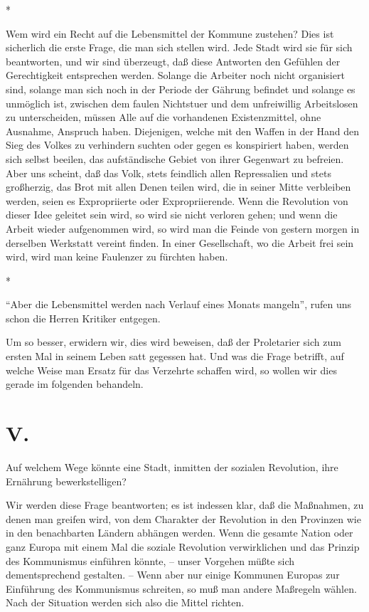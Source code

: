 \documentclass{scrbook}
\begin{document}
\begin{center}*\end{center}

Wem wird ein Recht auf die Lebensmittel der Kommune zustehen? Dies ist sicherlich die erste Frage, die man sich stellen wird. Jede Stadt wird sie für sich beantworten, und wir sind überzeugt, daß diese Antworten den Gefühlen der Gerechtigkeit entsprechen werden. Solange die Arbeiter noch nicht organisiert sind, solange man sich noch in der Periode der Gährung befindet und solange es unmöglich ist, zwischen dem faulen Nichtstuer und dem unfreiwillig Arbeitslosen zu unterscheiden, müssen Alle auf die vorhandenen Existenzmittel, ohne Ausnahme, Anspruch haben. Diejenigen, welche mit den Waffen in der Hand den Sieg des Volkes zu verhindern suchten oder gegen es konspiriert haben, werden sich selbst beeilen, das aufständische Gebiet von ihrer Gegenwart zu befreien. Aber uns scheint, daß das Volk, stets feindlich allen Repressalien und stets großherzig, das Brot mit allen Denen teilen wird, die in seiner Mitte verbleiben werden, seien es Expropriierte oder Expropriierende. Wenn die Revolution von dieser Idee geleitet sein wird, so wird sie nicht verloren gehen; und wenn die Arbeit wieder aufgenommen wird, so wird man die Feinde von gestern morgen in derselben Werkstatt vereint finden. In einer Gesellschaft, wo die Arbeit frei sein wird, wird man keine Faulenzer zu fürchten haben.

\begin{center}*\end{center}

``Aber die Lebensmittel werden nach Verlauf eines Monats mangeln'', rufen uns schon die Herren Kritiker entgegen.

Um so besser, erwidern wir, dies wird beweisen, daß der Proletarier sich zum ersten Mal in seinem Leben satt gegessen hat. Und was die Frage betrifft, auf welche Weise man Ersatz für das Verzehrte schaffen wird, so wollen wir dies gerade im folgenden behandeln.

\section*{V.}

Auf welchem Wege könnte eine Stadt, inmitten der sozialen Revolution, ihre Ernährung bewerkstelligen?

Wir werden diese Frage beantworten; es ist indessen klar, daß die Maßnahmen, zu denen man greifen wird, von dem Charakter der Revolution in den Provinzen wie in den benachbarten Ländern abhängen werden. Wenn die gesamte Nation oder ganz Europa mit einem Mal die soziale Revolution verwirklichen und das Prinzip des Kommunismus einführen könnte, – unser Vorgehen müßte sich dementsprechend gestalten. – Wenn aber nur einige Kommunen Europas zur Einführung des Kommunismus schreiten, so muß man andere Maßregeln wählen. Nach der Situation werden sich also die Mittel richten.
\end{document}
